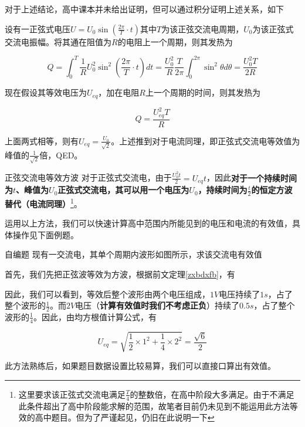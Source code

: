 对于上述结论，高中课本并未给出证明，但可以通过积分证明上述关系，如下

设有一正弦式电压$U = U_0 \sin (\frac{2 \pi}{T} \cdot t )$其中$T$为该正弦交流电周期，$U_0$为该正弦式交流电振幅。将其通在阻值为$R$的电阻上一个周期，则其发热为

$$Q = \int_0^T \frac{1}{R} U_0^2 \sin^2 (\frac{2 \pi}{T} \cdot t ) dt = \frac{U_0^2}{R} \frac{T}{2 \pi} \int_0^{2 \pi} \sin^2 \theta d \theta = \frac{U_0^2 T}{2R}$$

现在假设其等效电压为$U_{eq}$，加在电阻$R$上一个周期的时间，则其发热为

$$ Q = \frac{U_{eq}^2 T}{R} $$

上面两式相等，则有$U_{eq} = \frac{U_0}{\sqrt{2}}$。上述推到对于电流同理，即正弦式交流电等效值为峰值的$\frac{1}{\sqrt{2}}$倍，QED。

\begin{theo}[label=zxbdxfb]{正弦交流电等效方波}{}
对于正弦式交流电，由于$\frac{U_0^2 t}{2} = U_{eq} t$，因此\textbf{对于一个持续时间为$t$、峰值为$U_0$正弦式交流电，其可以用一个电压为$U_0$，持续时间为$\frac{t}{2}$的恒定方波替代（电流同理）}\footnote{这里要求该正弦式交流电满足$\frac{T}{4}$的整数倍，在高中阶段大多满足。由于不满足此条件超出了高中阶段能求解的范围，故笔者目前仍未见到不能运用此方法等效的高中题目。但为了严谨起见，仍旧在此说明一下}。
\end{theo}



运用以上方法，我们可以快速计算高中范围内所能见到的电压和电流的有效值，具体操作见下面例题。

\begin{ep}{自编题}{}
现有一交流电，其单个周期内波形如图所示，求该交流电有效值



首先，我们先把正弦波等效为方波，根据前文定理\eqref{zxbdxfb}，有



因此，我们可以看到，等效后整个波形由两个电压组成，$1V$电压持续了$1s$，占了整个波形的$\frac{1}{2}$。而$2V$电压（\textbf{计算有效值时我们不考虑正负}）持续了$0.5s$，占了整个波形的$\frac{1}{4}$。因此，由均方根值计算公式，有

$$U_{eq} = \sqrt{\frac{1}{2} \times 1^2 + \frac{1}{4} \times 2^2} = \frac{\sqrt{6}}{2}$$

此方法熟练后，如果题目数据设置比较易算，我们可以直接口算出有效值。

\end{ep}

